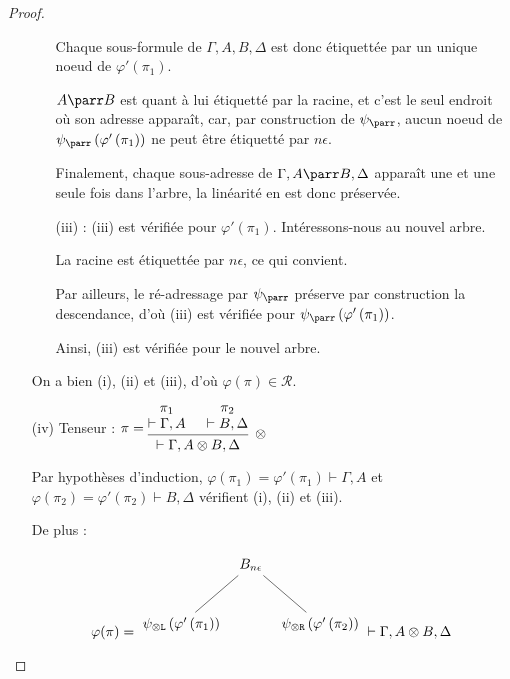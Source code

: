 \documentclass[11pt,a4paper]{article}
\theoremstyle{plain}
\theoremstyle{definition}
\theoremstyle{remark}
\newcommand*{\tensor}{\otimes}
\newcommand*{\namedproofv}[2]{\hypo{#1}\infer[no rule]{1}{\vdash #2}}
\newcommand*{\tensorv}[1]{\infer{2}[\ensuremath{\tensor}]{\vdash #1}}
\newcommand*{\someproof}{\pi}
\newcommand*{\Left}{\textnormal{\texttt{L}}}
\newcommand*{\Right}{\textnormal{\texttt{R}}}
\newcommand*{\representations}{\ensuremath{\mathcal{R}}}
\newcommand*{\encode}{\ensuremath{\varphi}}
\begin{document}
\begin{proof}
\begin{itemize}
\begin{itemize}
        Chaque sous-formule de $\Gamma, A, B, \Delta$ est donc étiquettée par un unique noeud de $\encode ' \left( \pi_1 \right)$.
        
        $A \parr B$ est quant à lui étiquetté par la racine, et c'est le seul endroit où son adresse apparaît, car, par construction de $\psi_\parr$, aucun noeud de $\psi_\parr \left( \encode' \left( \pi_1 \right) \right)$ ne peut être étiquetté par $n \epsilon$.

        Finalement, chaque sous-adresse de $\Gamma, A \parr B, \Delta$ apparaît une et une seule fois dans l'arbre, la linéarité en est donc préservée.
        
        \item[(iii) :]
        (iii) est vérifiée pour $\encode ' \left( \pi_1 \right)$. Intéressons-nous au nouvel arbre. 
        
        La racine est étiquettée par $n \epsilon$, ce qui convient. 

        Par ailleurs, le ré-adressage par $\psi_\parr$ préserve par construction la descendance, d'où (iii) est vérifiée pour $\psi_\parr \left( \encode' \left( \pi_1 \right) \right)$.

        Ainsi, (iii) est vérifiée pour le nouvel arbre.
    \end{itemize}

    On a bien (i), (ii) et (iii), d'où $\encode \left( \someproof \right) \in \representations$.

     \item[(iv) Tenseur :]$\someproof =
    \begin{prooftree}
      \namedproofv{\pi_1}{\Gamma, A}
      \namedproofv{\pi_2}{B, \Delta}
      \tensorv{\Gamma, A \tensor B, \Delta}
    \end{prooftree}$

    Par hypothèses d'induction, $\encode \left( \pi_1 \right) = \encode ' \left( \pi_1 \right) \vdash \Gamma, A$ et $\encode \left( \pi_2 \right) = \encode ' \left( \pi_2 \right) \vdash B, \Delta$ vérifient (i), (ii) et (iii).
    
    De plus :

    \begin{equation*}
    \encode ( \someproof ) = \begin{tikzpicture}%
    [level distance=1.5cm,
    level 1/.style={sibling distance=3.5cm}]
    \node {$B_{n \epsilon}$}
        child {node {$\psi_{\tensor\Left} \left( \encode' \left( \pi_1 \right) \right)$}}
        child {node {$\psi_{\tensor\Right} \left( \encode' \left( \pi_2 \right) \right)$}
    };
    \end{tikzpicture} \vdash \Gamma, A \tensor B, \Delta
    \end{equation*}


\end{itemize}
\end{proof}
\end{document}

